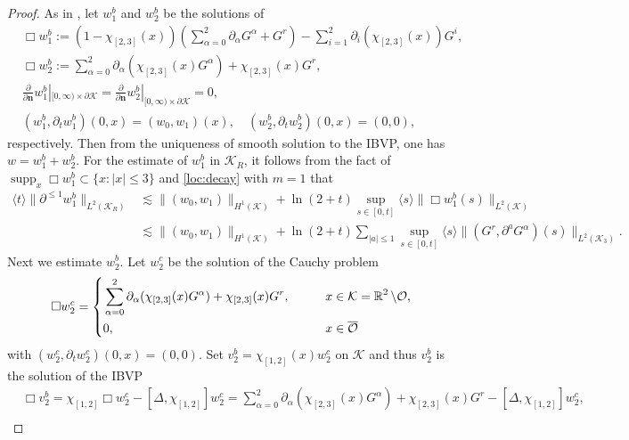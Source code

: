 \documentclass[11pt,twoside]{article}
\def\cK{\mathcal K}
\def\cO{\mathcal O}
\def\R{\mathop{\mathbb R\kern 0pt}\nolimits}
\def\supp{\mathop{\rm supp}\nolimits}
\def\p{\partial}
\def\supp{\operatorname{supp}}
\def\ls{\lesssim}
\def\bn{\mathbf{n}}
\newcommand{\w}[1]{\langle {#1} \rangle}
\theoremstyle{plain}
\theoremstyle{definition}
\numberwithin{equation}{section}
\begin{document}
\begin{proof}
As in \cite{HouYinYuan24}, let $w_1^b$ and $w_2^b$ be the solutions of
\begin{equation}\label{loc:ibvp:pf1}
\begin{split}
&\Box w_1^b:=(1-\chi_{[2,3]}(x))(\sum_{\alpha=0}^2\p_{\alpha}G^\alpha+G^r)-\sum_{i=1}^2\p_i(\chi_{[2,3]}(x))G^i,\\
&\Box w_2^b:=\sum_{\alpha=0}^2\p_{\alpha}(\chi_{[2,3]}(x)G^\alpha)+\chi_{[2,3]}(x)G^r,\\
&\frac{\p}{\p\bn}w_1^b|_{[0,\infty)\times\p\cK}=\frac{\p}{\p\bn}w_2^b|_{[0,\infty)\times\p\cK}=0,\\
&(w_1^b,\p_tw_1^b)(0,x)=(w_0,w_1)(x),\quad (w_2^b,\p_tw_2^b)(0,x)=(0,0),
\end{split}
\end{equation}
respectively.
Then from the uniqueness of smooth solution to the IBVP, one has $w=w_1^b+w_2^b$.
For the estimate of $w_1^b$ in $\cK_R$, it follows from the fact of $\supp_x\Box w_1^b\subset\{x:|x|\le3\}$ and \eqref{loc:decay} with $m=1$ that
\begin{equation}\label{loc:ibvp:pf2}
\begin{split}
\w{t}\|\p^{\le1}w_1^b\|_{L^2(\cK_R)}
&\ls\|(w_0,w_1)\|_{H^1(\cK)}+\ln(2+t)\sup_{s\in[0,t]}\w{s}\|\Box w_1^b(s)\|_{L^2(\cK)}\\
&\ls\|(w_0,w_1)\|_{H^1(\cK)}+\ln(2+t)\sum_{|a|\le1}\sup_{s\in[0,t]}\w{s}\|(G^r,\p^aG^\alpha)(s)\|_{L^2(\cK_3)}.
\end{split}
\end{equation}
Next we estimate $w_2^b$.
Let $w_2^c$ be the solution of the Cauchy problem
\begin{equation}\label{loc:ibvp:pf3}
\Box w_2^c=\left\{
\begin{aligned}
&\sum_{\alpha=0}^2\p_{\alpha}(\chi_{[2,3]}(x)G^\alpha)+\chi_{[2,3]}(x)G^r,\qquad&& x\in\cK=\R^2\setminus\cO,\\
&0,&& x\in\overline{\cO}
\end{aligned}
\right.
\end{equation}
with $(w_2^c, \p_tw_2^c)(0,x)=(0,0)$.
Set $v_2^b=\chi_{[1,2]}(x)w_2^c$ on $\cK$ and thus $v_2^b$ is the solution of the IBVP
\begin{equation}\label{loc:ibvp:pf4}
\begin{split}
&\Box v_2^b=\chi_{[1,2]}\Box w_2^c-[\Delta,\chi_{[1,2]}]w_2^c=\sum_{\alpha=0}^2\p_{\alpha}(\chi_{[2,3]}(x)G^\alpha)+\chi_{[2,3]}(x)G^r-[\Delta,\chi_{[1,2]}]w_2^c,\\

\end{split}
\end{equation}
\end{proof}
\end{document}
